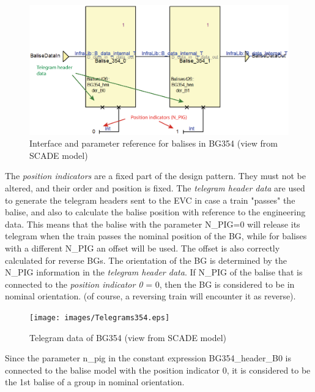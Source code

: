 \documentclass{template/openetcs_article}
\begin{document}
\begin{figure}[H]
  \centering
  \includegraphics[width=5in]{images/BalisesInBG354.eps}
  \caption{Interface and parameter reference for balises in BG354 (view from SCADE model)}
  \label{fig:balisesBG354SCADE}
\end{figure}

The \emph{position indicators} are a fixed part of the design pattern. They must not be altered, and their order and position is fixed. The \emph{telegram header data} are used to generate the telegram headers sent to the EVC in case a train "passes" the balise, and also to calculate the balise position with reference to the engineering data. This means that the balise with the parameter N\_PIG=0 will release its telegram when the train passes the nominal position of the BG, while for balises with a different N\_PIG an offset will be used. The offset is also correctly calculated for reverse BGs.\newline
The orientation of the BG is determined by the N\_PIG information in the \emph{telegram header data}. If N\_PIG of the balise that is connected to the \emph{position indicator 0} = 0, then the BG is considered to be in nominal orientation. (of course, a reversing train will encounter it as reverse).

\begin{figure}[H]
  \centering
  \texttt{[image: images/Telegrams354.eps]}
  \caption{Telegram data of BG354 (view from SCADE model)}
  \label{fig:telegrams354SCADE}
\end{figure}

Since the parameter n\_pig in the constant expression BG354\_header\_B0 is connected to the balise model with the position indicator 0, it is considered to be the 1st balise of a group in nominal orientation. 
\end{document}
